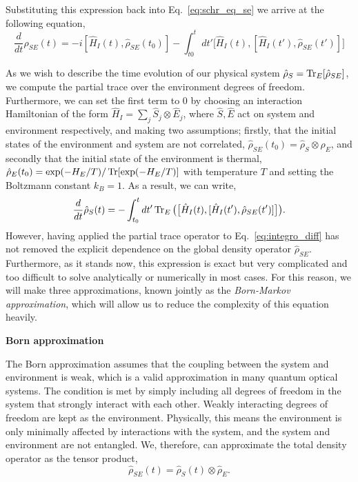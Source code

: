 Substituting this expression back into Eq.~\ref{eq:schr_eq_se} we arrive at the following equation, 
\begin{equation}
\label{eq:integro_diff}
    \frac{d}{dt} \hat{\rho}_{SE}(t) = -i [\hat{H}_I(t),\hat{\rho}_{SE}(t_0)] - \int_{t0}^t dt' \big[\hat{H}_I(t), [\hat{H}_I(t'),\hat{\rho}_{SE}(t')]\big]
\end{equation}

As we wish to describe the time evolution of our physical system $\hat{\rho}_S = \Tr_E[\hat{\rho}_{SE}]$, we compute the partial trace over the environment degrees of freedom. Furthermore, we can set the first term to $0$ by choosing an interaction Hamiltonian of the form $\hat{H}_I = \sum\limits_j \hat{S}_j \otimes \hat{E}_j$, where $\hat{S}, \hat{E}$ act on system and environment respectively, and making two assumptions; firstly, that the initial states of the environment and system are not correlated, $\hat{\rho}_{SE}(t_0) = \hat{\rho}_S \otimes\hat{\rho}_E$, and secondly that the initial state of the environment is thermal, $\hat{\rho}_E(t_0) = \exp(- H_E/T)/\Tr[\exp(- H_E/T)]$ with temperature $T$ and setting the Boltzmann constant $k_B=1$. As a result, we can write,
\begin{equation}
\label{eq:integro_diff_trace}
\frac{d}{dt} \hat{\rho}_S(t) = - \int_{t_0}^{t} dt' \Tr_E\big(\big[\hat{H}_ I(t), [\hat{H}_I(t'),\hat{\rho}_{SE}(t')]\big]\big).
\end{equation}
However, having applied the partial trace operator to Eq.~\ref{eq:integro_diff} has not removed the explicit dependence on the global density operator $\hat{\rho}_{SE}$. Furthermore, as it stands now, this expression is exact but very complicated and too difficult to solve analytically or numerically in most cases. For this reason, we will make three approximations, known jointly as the \textit{Born-Markov approximation}, which will allow us to reduce the complexity of this equation heavily. 

\textbf{Born approximation}

The Born approximation assumes that the coupling between the system and environment is weak, which is a valid approximation in many quantum optical systems. The condition is met by simply including all degrees of freedom in the system that strongly interact with each other. Weakly interacting degrees of freedom are kept as the environment. Physically, this means the environment is only minimally affected by interactions with the system, and the system and environment are not entangled. We, therefore, can approximate the total density operator as the tensor product,
\begin{equation}
    \hat{\rho}_{SE}(t) = \hat{\rho}_S(t) \otimes \hat{\rho}_E.
\end{equation}

